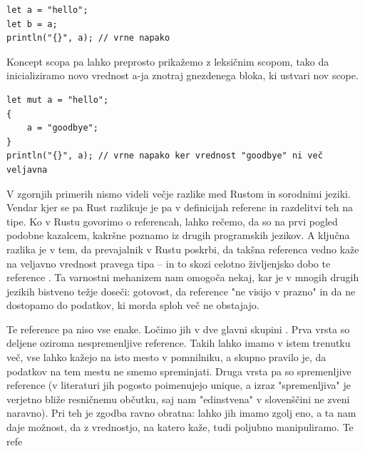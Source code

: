 \documentclass[a4paper,12pt,openright]{book}
\begin{document}
\begin{listing}[!ht]
	\begin{verbatim}
let a = "hello";
let b = a;
println("{}", a); // vrne napako
\end{verbatim}
	\caption{Primer lastništva}
	\label{listing:ownership1}
\end{listing}

Koncept scopa pa lahko preprosto prikažemo z leksičnim scopom, tako da inicializiramo novo vrednost a-ja
znotraj gnezdenega bloka, ki ustvari nov scope.

\begin{listing}[!ht]
	\begin{verbatim}
let mut a = "hello";
{
    a = "goodbye";
}
println("{}", a); // vrne napako ker vrednost "goodbye" ni več veljavna
\end{verbatim}
	\caption{Primer scopa}
	\label{listing:scope1}
\end{listing}

V zgornjih primerih nismo videli večje razlike med Rustom in sorodnimi jeziki. Vendar kjer se pa Rust razlikuje
je pa v definicijah referenc in razdelitvi teh na tipe. Ko v Rustu govorimo o referencah, lahko rečemo, da so na
prvi pogled podobne kazalcem, kakršne poznamo iz drugih programskih jezikov. A ključna razlika je v tem, da prevajalnik
v Rustu poskrbi, da takšna referenca vedno kaže na veljavno vrednost pravega tipa – in to skozi celotno življenjsko
dobo te reference \cite{klabnikRustProgrammingLanguage2023}. Ta varnostni mehanizem nam omogoča nekaj, kar je v
mnogih drugih jezikih bistveno težje doseči: gotovost, da reference "ne visijo v prazno" in da ne dostopamo do
podatkov, ki morda sploh več ne obstajajo.

Te reference pa niso vse enake. Ločimo jih v dve glavni skupini \cite{crichtonGroundedConceptualModel2023,yanovskiGhostCellSeparatingPermissions2021,weissOxideEssenceRust2019}.
Prva vrsta so deljene oziroma nespremenljive reference. Takih lahko imamo v istem trenutku več, vse lahko kažejo
na isto mesto v pomnilniku, a skupno pravilo je, da podatkov na tem mestu ne smemo spreminjati. Druga vrsta pa so
spremenljive reference (v literaturi jih pogosto poimenujejo unique, a izraz "spremenljiva" je verjetno bliže resničnemu
občutku, saj nam "edinstvena" v slovenščini ne zveni naravno). Pri teh je zgodba ravno obratna: lahko jih imamo zgolj eno,
a ta nam daje možnost, da z vrednostjo, na katero kaže, tudi poljubno manipuliramo. Te refe
\end{document}
